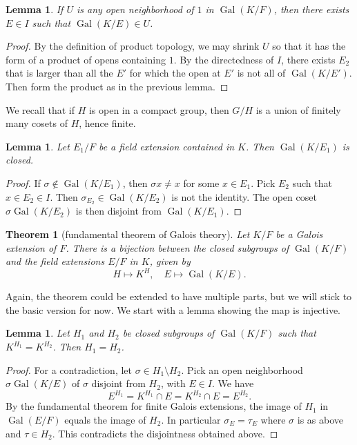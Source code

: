 \documentclass{amsart}
\def\op#1{{\operatorname{#1}}}
\newtheorem{theorem}[equation]{Theorem}
\newtheorem{lemma}[equation]{Lemma}
\begin{document}
\begin{lemma} If $U$ is any open neighborhood of $1$ in $\op{Gal}(K/F)$, then
there exists $E\in I$ such that $\op{Gal}(K/E)\in U$.
\end{lemma}

\begin{proof}  By the definition of product topology, we may shrink $U$ so that
it has the form of a product of opens containing $1$.  By the directedness of $I$,
there exists $E_2$ that is larger than all the $E'$ for which the open at $E'$ is not all
of $\op{Gal}(K/E')$.  Then form the product as in the previous lemma.
\end{proof}

We recall that if $H$ is open in a compact group, then $G/H$ is a union of finitely
many cosets of $H$, hence finite.

\begin{lemma} Let $E_1/F$ be a field extension contained in $K$.  Then $\op{Gal}(K/E_1)$
is closed.
\end{lemma}

\begin{proof}  If $\sigma\not\in \op{Gal}(K/E_1)$, then $\sigma x\ne x$ for some
$x\in E_1$.  Pick $E_2$ such that $x\in E_2\in I$.  Then $\sigma_{E_2}\in\op{Gal}(K/E_2)$
is not the identity.  The open coset $\sigma \op{Gal}(K/E_2)$ is then disjoint
from $\op{Gal}(K/E_1)$.
\end{proof}

\begin{theorem}[fundamental theorem of Galois theory] Let $K/F$ be a Galois
extension of $F$.  There is a bijection between the closed subgroups of $\op{Gal}(K/F)$
and the field extensions $E/F$ in $K$, given by
\[
H \mapsto K^H,\quad E \mapsto \op{Gal}(K/E).
\]
\end{theorem}

Again, the theorem could be extended to have multiple parts, but we will
stick to the basic version for now.
We start with a lemma showing the map is injective.

\begin{lemma}  Let $H_1$ and $H_2$ be closed subgroups of $\op{Gal}(K/F)$
such that $K^{H_1}=K^{H_2}$.
Then $H_1 = H_2$.
\end{lemma}

\begin{proof} For a contradiction, let $\sigma\in H_1\setminus H_2$.
Pick an open neighborhood $\sigma \op{Gal}(K/E)$ of $\sigma$ disjoint from $H_2$,
with $E\in I$.
We have
\[
E^{H_1} = K^{H_1}\cap E = K^{H_2}\cap E = E^{H_2}.
\]
By the fundamental theorem for finite Galois extensions, the image
of $H_1$ in $\op{Gal}(E/F)$ equals the image of $H_2$.
In particular $\sigma_E = \tau_E$ where $\sigma$ is as above and $\tau\in H_2$.
This contradicts the disjointness obtained above.
\end{proof}
\end{document}
